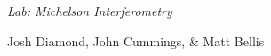{\LARGE {\em \noindent Lab: Michelson Interferometry}} 

\large{\noindent Josh Diamond, John Cummings, \&  Matt Bellis}


